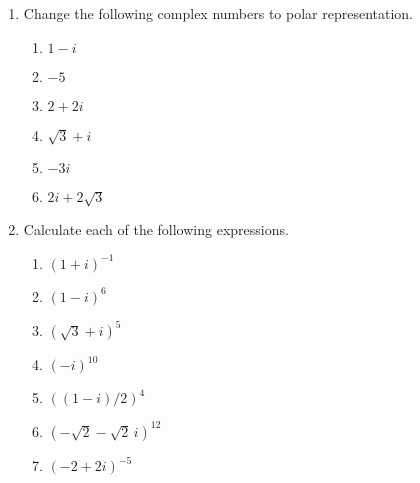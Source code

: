 {\begin{enumerate}
\begin{multicols}{2}
\begin{enumerate}
 
 \item
$5 \cis(9\pi/4)$

\item
$3 \cis(\pi)$
 
 \item
$\cis(7\pi/4) /2$
 
\end{enumerate}
\end{multicols}


\item	  %
Change the following complex numbers to polar representation.
\begin{multicols}{3}
\begin{enumerate}
 
 \item
$1-i$

 \item
$-5$
 
 \item
$2+2i$
 
 
\item
$\sqrt{3} + i$

 \item
$-3i$

 \item
$2i + 2 \sqrt{3}$
 
\end{enumerate}
\end{multicols}

 
 
\item %
Calculate each of the following expressions.
\begin{multicols}{2}
\begin{enumerate}
 
 \item
$(1+i)^{-1}$

 \item
$(1 - i)^{6}$
 
 \item
$(\sqrt{3}+i)^{5}$

 \item
$(-i)^{10}$
 
 \item
$((1-i)/2)^{4}$

 \item
$(-\sqrt{2} - \sqrt{2}\, i)^{12}$
 
 \item
$(-2+2i)^{-5}$
 
\end{enumerate}
\end{multicols}


\end{enumerate}}
